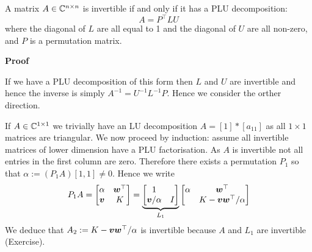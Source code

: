 \begin{theorem}[PLU] A matrix $A \in {\mathbb C}^{n \times n}$ is invertible if and only if it has a PLU decomposition:
\[
A = P^\ensuremath{\top} L U
\]
where the diagonal of $L$ are all equal to 1 and the diagonal of $U$ are all non-zero, and $P$ is a permutation matrix.

\end{theorem}
\textbf{Proof}

If we have a PLU decomposition of this form then $L$ and $U$ are invertible and hence the inverse is simply $A^{-1} = U^{-1} L^{-1} P$. Hence we consider the orther direction.

If $A \in {\mathbb C}^{1 \times 1}$ we trivially have an LU decomposition $A = [1] * [a_{11}]$ as all $1 \ensuremath{\times} 1$ matrices are triangular. We now proceed by induction: assume all invertible matrices of lower dimension have a PLU factorisation. As $A$ is invertible not all entries in the first column are zero. Therefore there exists a permutation $P_1$ so that $\ensuremath{\alpha} := (P_1 A)[1,1] \ensuremath{\neq} 0$. Hence we write
\[
P_1 A = \begin{bmatrix} \alpha & \bm{{\mbox{\boldmath$w$\unboldmath}}}^\top \\
                        \bm{{\mbox{\boldmath$v$\unboldmath}}} & K
                        \end{bmatrix} = \underbrace{\begin{bmatrix}
1 \\
\bm{{\mbox{\boldmath$v$\unboldmath}}}/\alpha & I \end{bmatrix}}_{L_1}  \begin{bmatrix} \alpha & \bm{{\mbox{\boldmath$w$\unboldmath}}}^\top \\  & K - \bm{{\mbox{\boldmath$v$\unboldmath}}} \bm{{\mbox{\boldmath$w$\unboldmath}}}^\top/\alpha \end{bmatrix}
\]
We deduce that $A_2 := K - \bm{{\mbox{\boldmath$v$\unboldmath}}} \bm{{\mbox{\boldmath$w$\unboldmath}}}^\top/\alpha$ is invertible because $A$ and $L_1$ are invertible (Exercise).

